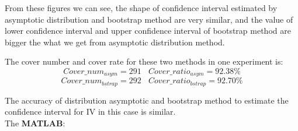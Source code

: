 \documentclass[12pt,letterpaper]{article}
\begin{document}
\begin{enumerate}[label=\textbf{(\Alph*)}]
From these figures we can see, the shape of confidence interval estimated by asymptotic distribution and bootstrap method are very similar, and the value of lower confidence interval and upper confidence interval of bootstrap method are bigger the what we get from asymptotic distribution method. 

The cover number and cover rate for these two methods in one experiment is:
$$Cover\_num_{asym}=291   ~~~~ Cover\_ratio_{asym}=92.38\% $$
$$Cover\_num_{bstrap}=292  ~~~~ Cover\_ratio_{bstrap}=92.70\%$$

The accuracy of distribution asymptotic and bootstrap method to estimate the confidence interval for IV in this case is similar.\\


The \textbf{MATLAB}:
   



\end{enumerate}
 

\newpage

\end{document}
